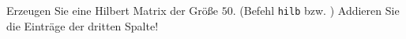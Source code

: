 \begin{aufg}[0]
Erzeugen Sie eine Hilbert Matrix der Größe $50$. (Befehl
\lstinline!hilb! bzw. ) Addieren
  Sie die Einträge der dritten Spalte! 
\end{aufg}
